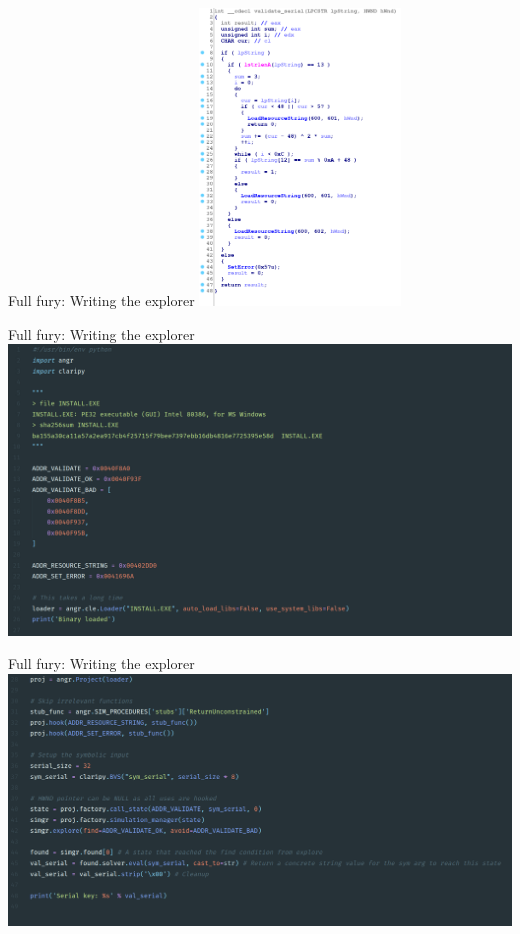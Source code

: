 \documentclass[10pt, compress, aspectratio=169]{beamer}
\begin{document}
\begin{frame}{Full fury: Writing the explorer}
  \includegraphics[width=0.4\textwidth]{images/sc1-10-angr2-c.png}
\end{frame}

\begin{frame}{Full fury: Writing the explorer}
  \includegraphics[width=\textwidth]{images/sc1-10-angr2-a.png}
\end{frame}

\begin{frame}{Full fury: Writing the explorer}
  \includegraphics[width=\textwidth]{images/sc1-10-angr2-b.png}
\end{frame}
\end{document}
